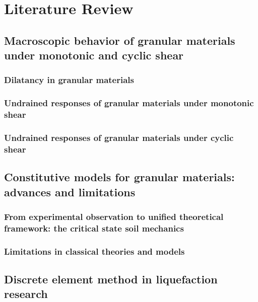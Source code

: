 \documentclass[../main]{subfiles}
\begin{document}
\chapter{Literature Review}
\label{ch:literature}

\section{Macroscopic behavior of granular materials under monotonic and cyclic shear}
\label{sec:macro_behavior}

\subsection{Dilatancy in granular materials}
\label{subsec:dilatancy}

\subsection{Undrained responses of granular materials under monotonic shear}
\label{subsec:undrained_monotonic}

\subsection{Undrained responses of granular materials under cyclic shear}
\label{subsec:undrained_cyclic}

\section{Constitutive models for granular materials: advances and limitations}
\label{sec:constitutive}

\subsection{From experimental observation to unified theoretical framework: the critical state soil mechanics}
\label{subsec:cssm}

\subsection{Limitations in classical theories and models}
\label{subsec:limitations}

\section{Discrete element method in liquefaction research}
\label{sec:dem_liq}
\end{document}
